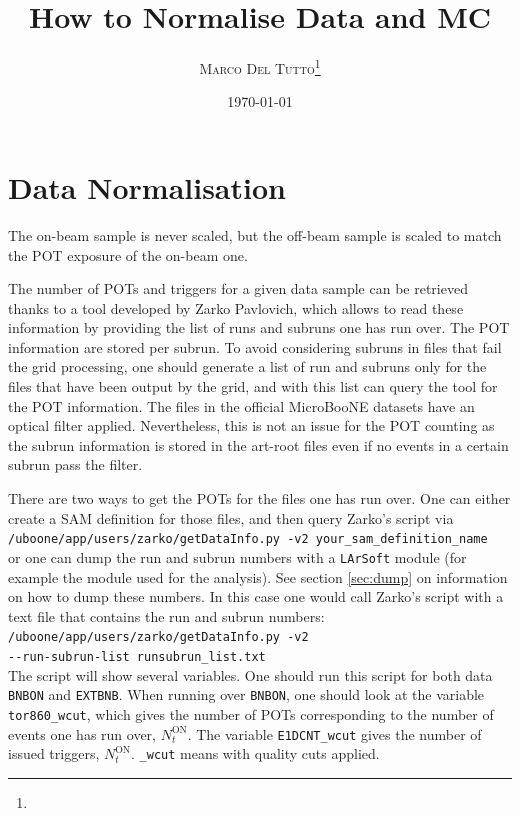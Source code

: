 \documentclass[a4paper, oneside, 12pt, onecolumn]{article}
\title{How to Normalise Data and MC} %
\author{%
\textsc{Marco Del Tutto}\thanks{\mail{marco.deltutto@physics.ox.ac.uk}} \\ %
}
\date{\today} %
\newcommand{\ls}{\texttt{LArSoft}\xspace}
\newcommand{\extbnb}{\texttt{EXTBNB}\xspace}
\newcommand{\bnbon}{\texttt{BNBON}\xspace}
\begin{document}
\maketitle





\section{Data Normalisation}

The on-beam sample is never scaled, but the off-beam sample is scaled to match the POT exposure of the on-beam one.

The number of POTs and triggers for a given data sample can be retrieved thanks to a tool developed by Zarko Pavlovich, which allows to read these information by providing the list of runs and subruns one has run over. The POT information are stored per subrun. To avoid considering subruns in files that fail the grid processing, one should generate a list of run and subruns only for the files that have been output by the grid, and with this list can query the tool for the POT information. The files in the official MicroBooNE datasets have an optical filter applied. Nevertheless, this is not an issue for the POT counting as the subrun information is stored in the art-root files even if no events in a certain subrun pass the filter.

There are two ways to get the POTs for the files one has run over. One can either create a SAM definition for those files, and then query Zarko's script via\\

\texttt{/uboone/app/users/zarko/getDataInfo.py -v2 your\_sam\_definition\_name}\\

or one can dump the run and subrun numbers with a \ls module (for example the module used for the analysis). See section \ref{sec:dump} on information on how to dump these numbers. In this case one would call Zarko's script with a text file that contains the run and subrun numbers:\\

\texttt{/uboone/app/users/zarko/getDataInfo.py -v2 \\-\/-run-subrun-list runsubrun\_list.txt}\\

The script will show several variables. One should run this script for both data \bnbon and \extbnb. When running over \bnbon, one should look at the variable \texttt{tor860\_wcut}, which gives the number of POTs corresponding to the number of events one has run over, $N_t^\text{ON}$. The variable \texttt{E1DCNT\_wcut} gives the number of issued triggers, $N_t^\text{ON}$. \texttt{\_wcut} means with quality cuts applied.
\end{document}
